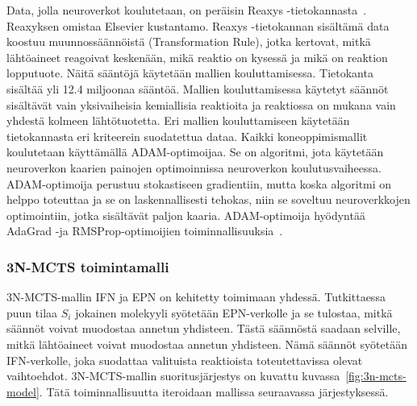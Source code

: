 \documentclass[finnish,twoside,censored,tkt,sw-line]{HYthesisML}
\begin{document}
Data, jolla neuroverkot koulutetaan, on peräisin Reaxys -tietokannasta~\cite{reaxys}.
Reaxyksen omistaa Elsevier kustantamo.
Reaxys -tietokannan sisältämä data koostuu muunnossäännöistä (Transformation Rule), jotka kertovat, mitkä lähtöaineet reagoivat keskenään, mikä reaktio on kysessä ja mikä on reaktion lopputuote.
Näitä sääntöjä käytetään mallien kouluttamisessa.
Tietokanta sisältää yli 12.4 miljoonaa sääntöä.
Mallien kouluttamisessa käytetyt säännöt sisältävät vain yksivaiheisia kemiallisia reaktioita ja reaktiossa on mukana vain yhdestä kolmeen lähtötuotetta.
Eri mallien kouluttamiseen käytetään tietokannasta eri kriteerein suodatettua dataa.
Kaikki koneoppimismallit koulutetaan käyttämällä ADAM-optimoijaa.
Se on algoritmi, jota käytetään neuroverkon kaarien painojen optimoinnissa neuroverkon koulutusvaiheessa.
ADAM-optimoija perustuu stokastiseen gradientiin, mutta koska algoritmi on helppo toteuttaa ja se on laskennallisesti tehokas, niin se soveltuu neuroverkkojen optimointiin, jotka sisältävät paljon kaaria.
ADAM-optimoija hyödyntää AdaGrad -ja RMSProp-optimoijien toiminnallisuuksia~\cite{kingma2017adam}.

\subsubsection{3N-MCTS toimintamalli}

3N-MCTS-mallin IFN ja EPN on kehitetty toimimaan yhdessä.
Tutkittaessa puun tilaa \(S_i\) jokainen molekyyli syötetään EPN-verkolle ja se tulostaa, mitkä säännöt voivat muodostaa annetun yhdisteen.
Tästä säännöstä saadaan selville, mitkä lähtöaineet voivat muodostaa annetun yhdisteen.
Nämä säännöt syötetään IFN-verkolle, joka suodattaa valituista reaktioista toteutettavissa olevat vaihtoehdot.
3N-MCTS-mallin suoritusjärjestys on kuvattu kuvassa~\ref{fig:3n-mcts-model}.
Tätä toiminnallisuutta iteroidaan mallissa seuraavassa järjestyksessä.
\end{document}
